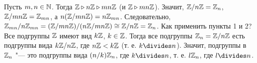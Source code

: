 \documentclass[main]{subfiles}
\begin{document}
\begin{example}
  Пусть $m, n \in \mathbb{N}$.
  Тогда $\mathbb{Z} \triangleright n \mathbb{Z} \triangleright mn \mathbb{Z}$
  (и $\mathbb{Z} \triangleright mn \mathbb{Z}$).
  Значит, $\Factor{\Integer}[n \Integer] = \Integer_n$,
  $\Factor{\Integer}[mn \Integer] = \Integer_{mn}$,
  а $n (\Factor{\Integer}[mn\Integer]) = n \Integer_{mn}$.
  Следовательно, $\Factor{\Integer_{mn}}[n \Integer_{mn}]
  = (\Integer/mn\Integer)/
  (n\Integer/mn\Integer) \cong \Integer/n\Integer = \Integer_n$.
  Как применить пункты 1 и 2?
  Все подгруппы $\mathbb{Z}$ имеют вид $k \mathbb{Z}$,
  $k \in \mathbb{Z}$.
  Тогда все подгруппы $\Integer_n = \Factor{\Integer}[n \Integer]$
  есть подгруппы вида $\Factor{k \Integer}[n \Integer]$,
  где $n \mathbb{Z} < k \mathbb{Z}$
  (т. е. $k \divides n$).
  Значит, подгруппы в $\mathbb{Z}_n$ "---
  это подгруппы вида $(n/k) \mathbb{Z}_n$,
  где $k \divides n$,
  т. е. $l \mathbb{Z}_n$, где $l \divides n$.
\end{example}
\end{document}
